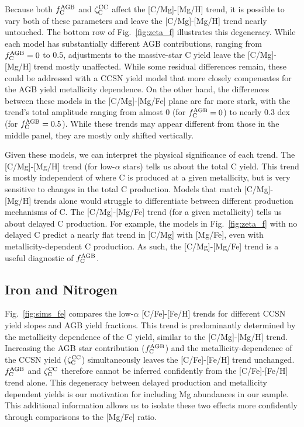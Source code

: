 \documentclass[fleqn,
usenatbib]{mnras}
\newcommand{\caah}{[C/Mg]-[Mg/H]}
\newcommand{\caafe}{[C/Mg]-[Mg/Fe]}
\newcommand{\fagb}{f_{\rm C}^{\rm AGB}}
\newcommand{\zcc}{\zeta_{\rm C}^{\rm CC}}
\begin{document}
Because both $\fagb{}$ and $\zcc$ affect the \caah{} trend, it is possible to vary both of these parameters and leave the \caah{} trend nearly untouched. 
The bottom row of Fig.~\ref{fig:zeta_f} illustrates this degeneracy.
While each model has substantially different AGB contributions, ranging from $\fagb = 0$ to $0.5$, adjustments to the massive-star C yield leave the \caah{} trend mostly unaffected. While some residual differences remain, these could be addressed with a CCSN yield model that more closely compensates for the AGB yield metallicity dependence. On the other hand, the differences between these models in the \caafe{} plane are far more stark, with the trend's total amplitude ranging from almost 0 (for $\fagb{} = 0$) to nearly 0.3 dex (for $\fagb{} = 0.5$). While these trends may appear different from those in the middle panel, they are mostly only shifted vertically.

Given these models, we can interpret the physical significance of each trend. The \caah{} trend (for low-$\alpha$ stars) tells us about the total C yield. This trend is mostly independent of where C is produced at a given metallicity, but is very sensitive to changes in the total C production. Models that match \caah{} trends alone would struggle to differentiate between different production mechanisms of C. The \caafe{} trend (for a given metallicity) tells us about delayed C production. For example, the models in Fig.~\ref{fig:zeta_f} with no delayed C predict a nearly flat trend in [C/Mg] with [Mg/Fe], even with metallicity-dependent C production. As such, the \caafe{} trend is a useful diagnostic of $\fagb$.


\subsection{Iron and Nitrogen} \label{sec:n_and_fe}

Fig.~\ref{fig:sims_fe} compares the low-$\alpha$ [C/Fe]-[Fe/H] trends for different CCSN yield slopes and AGB yield fractions. This trend is predominantly determined by the metallicity dependence of the C yield, similar to the \caah{} trend. Increasing the AGB star contribution ($\fagb$) and the metallicity-dependence of the CCSN yield ($\zcc$) simultaneously leaves the [C/Fe]-[Fe/H] trend unchanged. 
$\fagb$ and $\zcc$ therefore cannot be inferred confidently from the [C/Fe]-[Fe/H] trend alone. This degeneracy between delayed production and metallicity dependent yields is our motivation for including Mg abundances in our sample. This additional information allows us to isolate these two effects more confidently through comparisons to the [Mg/Fe] ratio.
\end{document}

